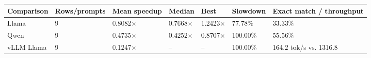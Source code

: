 \begin{tabular}{lllllll}
\toprule
Comparison & Rows/prompts & Mean speedup & Median & Best & Slowdown & Exact match / throughput \\
\midrule
Llama & 9 & 0.8082$\times$ & 0.7668$\times$ & 1.2423$\times$ & 77.78\% & 33.33\% \\
Qwen & 9 & 0.4735$\times$ & 0.4252$\times$ & 0.8707$\times$ & 100.00\% & 55.56\% \\
vLLM Llama & 9 & 0.1247$\times$ & -- & -- & 100.00\% & 164.2 tok/s vs. 1316.8 \\
\bottomrule
\end{tabular}

